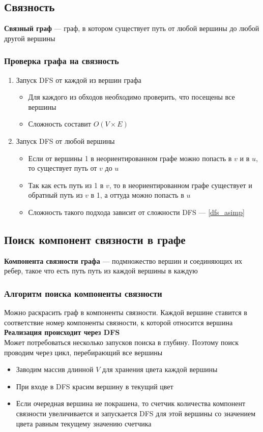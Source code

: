 \documentclass[a4paper]{article}
\begin{document}
\subsection{Связность}
\textbf{Связный граф} — граф, в котором существует путь от любой вершины до любой другой вершины
\subsubsection*{Проверка графа на связность}
\begin{enumerate}
    \item Запуск DFS от каждой из вершин графа
    \begin{itemize}
        \item Для каждого из обходов необходимо проверить, что посещены все вершины
        \item Сложность составит $O(V\times E)$
    \end{itemize}
    \item Запуск DFS от любой вершины
    \begin{itemize}
        \item Если от вершины 1 в неориентированном графе можно попасть в $v$ и в $u$, то существует путь от $v$ до $u$
        \item Так как есть путь из 1 в $v$, то в неориентированном графе существует и обратный путь из $v$ в 1, а оттуда можно попасть в $u$
        \item Сложность такого подхода зависит от сложности DFS — \ref{dfs_asimp}
    \end{itemize}
\end{enumerate}

\subsection{Поиск компонент связности в графе}
\label{2.3}
\textbf{Компонента связности графа} — подмножество вершин и соединяющих их ребер, такое что есть путь путь из каждой вершины в каждую
\subsubsection*{Алгоритм поиска компоненты связности}
Можно раскрасить граф в компоненты связности. Каждой вершине ставится в соответствие номер компоненты связности, к которой относится вершина\\[2mm]
\indent \textbf{Реализация происходит через DFS}\\
Может потребоваться несколько запусков поиска в глубину. Поэтому поиск проводим через цикл, перебирающий все вершины
\begin{itemize}
    \item Заводим массив длинной $V$ для хранения цвета каждой вершины
    \item При входе в DFS красим вершину в текущий цвет
    \item Если очередная вершина не покрашена, то счетчик количества компонент связности увеличивается и запускается DFS для этой вершины со значением цвета равным текущему значению счетчика
\end{itemize}
\end{document}
